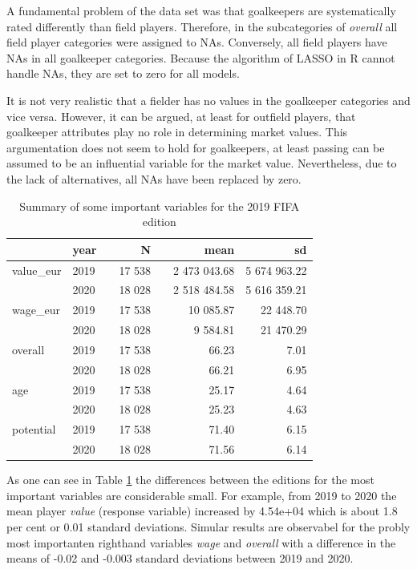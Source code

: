 \documentclass[12pt,a4paper]{article}
\begin{document}
\textcite{leone_fifa_2020}

A fundamental problem of the data set was that goalkeepers are
systematically rated differently than field players. Therefore, in the
subcategories of \emph{overall} all field player categories were
assigned to NAs. Conversely, all field players have NAs in all
goalkeeper categories. Because the algorithm of \ac{LASSO} in R cannot
handle NAs, they are set to zero for all models.

It is not very realistic that a fielder has no values in the goalkeeper
categories and vice versa. However, it can be argued, at least for
outfield players, that goalkeeper attributes play no role in determining
market values. This argumentation does not seem to hold for goalkeepers,
at least passing can be assumed to be an influential variable for the
market value. Nevertheless, due to the lack of alternatives, all NAs
have been replaced by zero.

\begin{table}[!h]

\caption{\label{tab:unnamed-chunk-3}\label{tab:sum} Summary of some important variables for the 2019 FIFA edition}
\centering
\begin{tabular}[t]{lllrlrr}
\toprule
 & year &  & N &   & mean & sd\\
\midrule
\rowcolor{gray!6}  value\_eur & 2019 &  & 17 538 &  & 2 473 043.68 & 5 674 963.22\\
 & 2020 &  & 18 028 &  & 2 518 484.58 & 5 616 359.21\\
\rowcolor{gray!6}  wage\_eur & 2019 &  & 17 538 &  & 10 085.87 & 22 448.70\\
 & 2020 &  & 18 028 &  & 9 584.81 & 21 470.29\\
\rowcolor{gray!6}  overall & 2019 &  & 17 538 &  & 66.23 & 7.01\\
 & 2020 &  & 18 028 &  & 66.21 & 6.95\\
\rowcolor{gray!6}  age & 2019 &  & 17 538 &  & 25.17 & 4.64\\
 & 2020 &  & 18 028 &  & 25.23 & 4.63\\
\rowcolor{gray!6}  potential & 2019 &  & 17 538 &  & 71.40 & 6.15\\
 & 2020 &  & 18 028 &  & 71.56 & 6.14\\
\bottomrule
\end{tabular}
\end{table}

As one can see in Table \ref{tab:sum} the differences between the
editions for the most important variables are considerable small. For
example, from 2019 to 2020 the mean player \emph{value} (response
variable) increased by 4.54e+04 which is about 1.8 per cent or 0.01
standard deviations. Simular results are observabel for the probly most
importanten righthand variables \emph{wage} and \emph{overall} with a
difference in the means of -0.02 and -0.003 standard deviations between
2019 and 2020.
\end{document}
